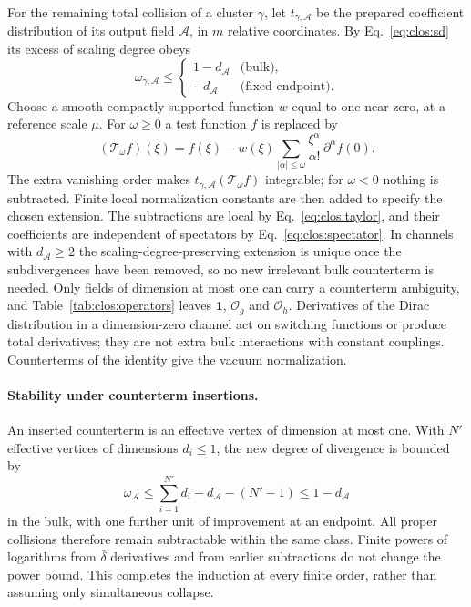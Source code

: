 \documentclass[11pt,a4paper]{article}
\numberwithin{equation}{section}
\newcommand{\db}{\bar\delta}
\newcommand{\Og}{\mathcal O_g}
\newcommand{\Oh}{\mathcal O_h}
\begin{document}
For the remaining total collision of a cluster $\gamma$, let $t_{\gamma,\mathcal A}$ be the prepared coefficient
distribution of its output field $\mathcal A$, in $m$ relative coordinates. By Eq.~\eqref{eq:clos:sd} its excess of
scaling degree obeys
\begin{equation}
 \omega_{\gamma,\mathcal A}\le
 \begin{cases}1-d_{\mathcal A}&\text{(bulk)},\\ -d_{\mathcal A}&\text{(fixed endpoint)}.\end{cases}
\end{equation}
Choose a smooth compactly supported function $w$ equal to one near zero, at a reference scale $\mu$. For
$\omega\ge0$ a test function $f$ is replaced by
\begin{equation}
 (\mathcal T_\omega f)(\xi)=f(\xi)-w(\xi)\sum_{|\alpha|\le\omega}\frac{\xi^\alpha}{\alpha!}\,\partial^\alpha f(0).
 \label{eq:clos:taylor}
\end{equation}
The extra vanishing order makes $t_{\gamma,\mathcal A}(\mathcal T_\omega f)$ integrable; for $\omega<0$ nothing is
subtracted. Finite local normalization constants are then added to specify the chosen extension. The subtractions are
local by Eq.~\eqref{eq:clos:taylor}, and their coefficients are independent of spectators by
Eq.~\eqref{eq:clos:spectator}. In channels with $d_{\mathcal A}\ge2$ the scaling-degree-preserving extension is unique
once the subdivergences have been removed, so no new irrelevant bulk counterterm is needed. Only fields of dimension at
most one can carry a counterterm ambiguity, and Table~\ref{tab:clos:operators} leaves $\mathbf 1$, $\Og$ and $\Oh$.
Derivatives of the Dirac distribution in a dimension-zero channel act on switching functions or produce total
derivatives; they are not extra bulk interactions with constant couplings. Counterterms of the identity give the
vacuum normalization.

\paragraph{Stability under counterterm insertions.} An inserted counterterm is an effective vertex of dimension at most
one. With $N'$ effective vertices of dimensions $d_i\le1$, the new degree of divergence is bounded by
\begin{equation}
 \omega_{\mathcal A}\le\sum_{i=1}^{N'}d_i-d_{\mathcal A}-(N'-1)\le1-d_{\mathcal A}
\end{equation}
in the bulk, with one further unit of improvement at an endpoint. All proper collisions therefore remain subtractable
within the same class. Finite powers of logarithms from $\db$ derivatives and from earlier subtractions do not change
the power bound. This completes the induction at every finite order, rather than assuming only simultaneous collapse.
\end{document}
